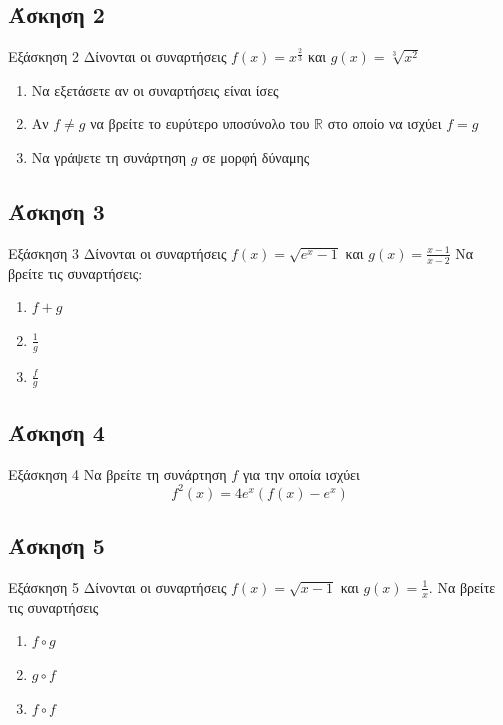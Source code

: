 \documentclass[greek]{beamer}
\begin{document}
\subsection{Άσκηση 2}
\begin{frame}[label=Άσκηση2,t]{Εξάσκηση 2}
      Δίνονται οι συναρτήσεις $f(x)=x^{\frac{2}{3}}$ και $g(x)=\sqrt[3]{x^2}$
      \begin{enumerate}
            \item<1-> Να εξετάσετε αν οι συναρτήσεις είναι ίσες
            \item<2-> Αν $f\ne g$ να βρείτε το ευρύτερο υποσύνολο του $\mathbb{R}$ στο οποίο να ισχύει $f=g$
            \item<3-> Να γράψετε τη συνάρτηση $g$ σε μορφή δύναμης
      \end{enumerate}

\end{frame}

\subsection{Άσκηση 3}
\begin{frame}[label=Άσκηση3,t]{Εξάσκηση 3}
      Δίνονται οι συναρτήσεις $f(x)=\sqrt{e^x-1}$ και $g(x)=\frac{x-1}{x-2}$
      Να βρείτε τις συναρτήσεις:
      \begin{enumerate}
            \item<1-> $f+g$
            \item<2-> $\frac{1}{g}$
            \item<3-> $\frac{f}{g}$
      \end{enumerate}

\end{frame}

\subsection{Άσκηση 4}
\begin{frame}[label=Άσκηση4,t]{Εξάσκηση 4}
      Να βρείτε τη συνάρτηση $f$ για την οποία ισχύει
      $$f^2(x)=4e^x\left(f(x)-e^x\right)$$

\end{frame}

\subsection{Άσκηση 5}
\begin{frame}[label=Άσκηση5,t]{Εξάσκηση 5}
      Δίνονται οι συναρτήσεις $f(x)=\sqrt{x-1}$ και $g(x)=\frac{1}{x}$. Να βρείτε τις συναρτήσεις
      \begin{enumerate}
            \item<1-> $f\circ g$
            \item<2-> $g\circ f$
            \item<3-> $f\circ f$
      \end{enumerate}

\end{frame}
\end{document}
